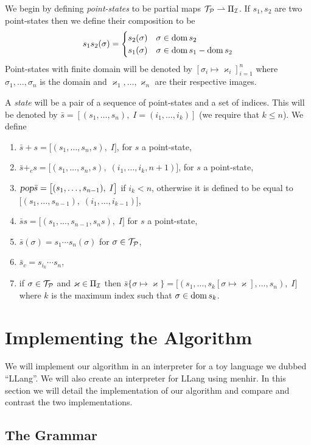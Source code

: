\documentclass{llncs}
\newcounter{algo}
\begin{document}
We begin by defining \textit{point-states} to be partial maps $\mathcal T_{\mathcal P}\rightharpoonup\Pi_{\mathcal I}$.
If $s_1,s_2$ are two point-states then we define their composition to be
\[ s_1s_2(\sigma) = \begin{cases} s_2(\sigma) & \sigma\in\operatorname{dom} s_2\\ s_1(\sigma) & \sigma\in\operatorname{dom} s_1-\operatorname{dom} s_2\end{cases} \]
Point-states with finite domain will be denoted by $[\sigma_i\mapsto\varkappa_i]_{i=1}^n$ where $\sigma_1,\dots,\sigma_n$ is the domain and $\varkappa_1,\dots,\varkappa_n$ are their respective images.

A \textit{state} will be a pair of a sequence of point-states and a set of indices.
This will be denoted by $\bar s=[(s_1,\dots,s_n),\;I=(i_1,\dots,i_k)]$ (we require that $k\leq n$).
We define
\begin{enumerate}
    \item $\bar s+s=\bigl[(s_1,\dots,s_n,s),\;I\bigr]$, for $s$ a point-state,
    \item $\bar s+_cs=\bigl[(s_1,\dots,s_n,s),\;(i_1,\dots,i_k,n+1)\bigr]$, for $s$ a point-state,
    \item $\textsl{pop}\bar s=\bigl[(s_1,\dots,s_{n-1}),\;I\bigr]$ if $i_k<n$, otherwise it is defined to be equal to $\bigl[(s_1,\dots,s_{n-1}),\;(i_1,\dots,i_{k-1})\bigr]$,
    \item $\bar ss=\bigl[(s_1,\dots,s_{n-1},s_ns),\;I\bigr]$ for $s$ a point-state,
    \item $\bar s(\sigma)=s_1\cdots s_n(\sigma)$ for $\sigma\in\mathcal T_{\mathcal P}$,
    \item $\bar s_c=s_{i_k}\cdots s_n$,
    \item if $\sigma\in\mathcal T_{\mathcal P}$ and $\varkappa\in\Pi_{\mathcal I}$ then $\bar s\{\sigma\mapsto\varkappa\}=\bigl[(s_1,\dots,s_k[\sigma\mapsto\varkappa],\dots,s_n),\;I\bigr]$ where $k$ is the maximum index such that
    $\sigma\in\operatorname{dom} s_k$.
\end{enumerate}

\section{Implementing the Algorithm}

We will implement our algorithm in an interpreter for a toy language we dubbed ``LLang''.
We will also create an interpreter for LLang using menhir\NEEDCITE{}.
In this section we will detail the implementation of our algorithm and compare and contrast the two implementations.

\subsection{The Grammar}
\end{document}
